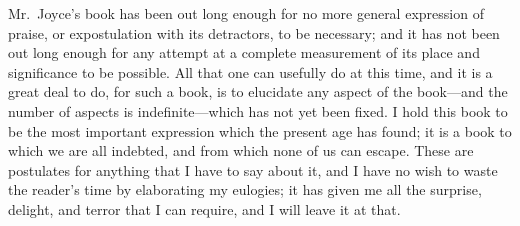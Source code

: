Mr.~Joyce's book has been out long enough for no more general expression
of praise, or expostulation with its detractors, to be necessary; and it
has not been out long enough for any attempt at a complete measurement
of its place and significance to be possible. All that one can usefully
do at this time, and it is a great deal to do, for such a book, is to
elucidate any aspect of the book---and the number of aspects is
indefinite---which has not yet been fixed. I hold this book to be the
most important expression which the present age has found; it is a book
to which we are all indebted, and from which none of us can escape.
These are postulates for anything that I have to say about it, and I
have no wish to waste the reader's time by elaborating my eulogies; it
has given me all the surprise, delight, and terror that I can require,
and I will leave it at that.

